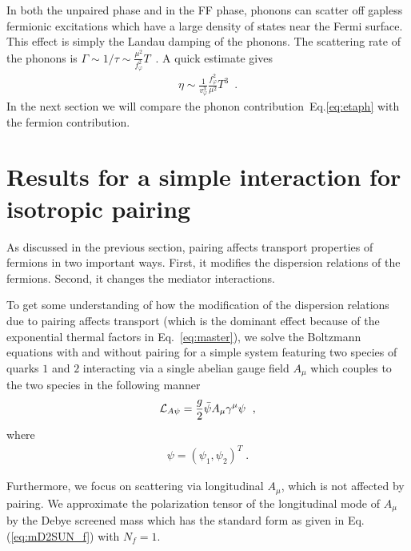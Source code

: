 \documentclass[10pt, aps, prd, superscriptaddress, nofootinbib, 
               amsmath, amssymb, twocolumn,
               preprintnumbers, showpacs,
               raggedbottom,
               floatfix]{revtex4-1}
\newcommand{\calL}{{\cal{L}}}
\begin{document}
In both the unpaired phase and in the FF phase, phonons can scatter off gapless
fermionic excitations which have a large density of states near the Fermi
surface. This effect is simply the Landau damping of the phonons. The
scattering rate of the phonons is $\Gamma \sim 1/\tau \sim
\frac{\mu^2}{f_\varphi^2}T$~\cite{Aguilera:2008ed}.
A quick estimate gives
\begin{equation}
\begin{split}
\eta\sim \frac{1}{v_\varphi^3} \frac{f_\varphi^2}{\mu^2} T^3~\label{eq:etaph}\;.
\end{split}
\end{equation}
In the next section we will compare the phonon contribution~Eq.\ref{eq:etaph} with the 
fermion contribution.

\section{Results for a simple interaction for isotropic pairing}
\label{sec:simple}
As discussed in the previous section, pairing affects transport properties of
fermions in two important ways. First, it modifies the dispersion relations of
the fermions. Second, it changes the mediator interactions.

To get some understanding of how the modification of the dispersion relations
due to pairing affects transport (which is the dominant effect because of the
exponential thermal factors in Eq.~\ref{eq:master}), we solve the Boltzmann
equations with and without pairing for a simple system featuring two species of
quarks $1$ and $2$ interacting via a single abelian gauge field $A_\mu$ which
couples to the two species in the following manner
\begin{equation}
\begin{split}
\calL_{A\psi} = \frac{g}{2} \bar{\psi} A_\mu\gamma^{\mu}
\psi~\label{eq:simple_interaction}\;,
\end{split}
\end{equation}
where 
\begin{equation}
\begin{split}
\psi = (\psi_1,\psi_2)^T\;.
\end{split}
\end{equation}

Furthermore, we focus on scattering via longitudinal $A_\mu$, which is not
affected by pairing. We approximate the polarization tensor of the longitudinal
mode of $A_\mu$ by the Debye screened mass which has the standard form as given in 
Eq.(\ref{eq:mD2SUN_f}) with $N_f=1$.
\end{document}
